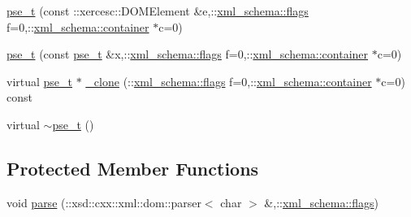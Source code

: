 \begin{DoxyCompactItemize}
\item 
\hyperlink{classpse__t_a751d788755e53441737f792453d665a2}{pse\-\_\-t} (const \-::xercesc\-::\-D\-O\-M\-Element \&e,\-::\hyperlink{namespacexml__schema_a0612287d030cb2732d31a45b258fdc87}{xml\-\_\-schema\-::flags} f=0,\-::\hyperlink{namespacexml__schema_ada9aa30dc722e93ee2ed7243085402a5}{xml\-\_\-schema\-::container} $\ast$c=0)
\item 
\hyperlink{classpse__t_adb96d77efda033d89be5625ebfd809ae}{pse\-\_\-t} (const \hyperlink{classpse__t}{pse\-\_\-t} \&x,\-::\hyperlink{namespacexml__schema_a0612287d030cb2732d31a45b258fdc87}{xml\-\_\-schema\-::flags} f=0,\-::\hyperlink{namespacexml__schema_ada9aa30dc722e93ee2ed7243085402a5}{xml\-\_\-schema\-::container} $\ast$c=0)
\item 
virtual \hyperlink{classpse__t}{pse\-\_\-t} $\ast$ \hyperlink{classpse__t_abd24942c0ca4e9438281311fd2d80515}{\-\_\-clone} (\-::\hyperlink{namespacexml__schema_a0612287d030cb2732d31a45b258fdc87}{xml\-\_\-schema\-::flags} f=0,\-::\hyperlink{namespacexml__schema_ada9aa30dc722e93ee2ed7243085402a5}{xml\-\_\-schema\-::container} $\ast$c=0) const 
\item 
virtual \hyperlink{classpse__t_a2e3550f7cfd55f1e9eeabe3b82190ca2}{$\sim$pse\-\_\-t} ()
\end{DoxyCompactItemize}
\subsection*{Protected Member Functions}
\begin{DoxyCompactItemize}
\item 
void \hyperlink{classpse__t_abfac388222d2181704d014f45e6398ee}{parse} (\-::xsd\-::cxx\-::xml\-::dom\-::parser$<$ char $>$ \&,\-::\hyperlink{namespacexml__schema_a0612287d030cb2732d31a45b258fdc87}{xml\-\_\-schema\-::flags})
\end{DoxyCompactItemize}
